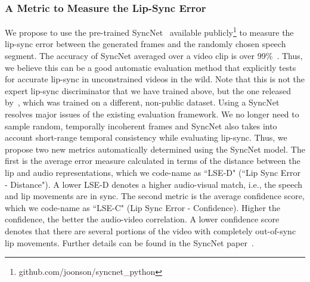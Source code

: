 \documentclass[sigconf]{acmart}
\begin{document}
\subsubsection{A Metric to Measure the Lip-Sync Error}
We propose to use the pre-trained SyncNet~\cite{Chung16a} available publicly\footnote{github.com/joonson/syncnet\_python} to measure the lip-sync error between the generated frames and the randomly chosen speech segment. The accuracy of SyncNet averaged over a video clip is over 99\%~\cite{Chung16a}. Thus, we believe this can be a good automatic evaluation method that explicitly tests for accurate lip-sync in unconstrained videos in the wild. Note that this is not the expert lip-sync discriminator that we have trained above, but the one released by~\citet{Chung16a}, which was trained on a different, non-public dataset. Using a SyncNet resolves major issues of the existing evaluation framework. We no longer need to sample random, temporally incoherent frames and SyncNet also takes into account short-range temporal consistency while evaluating lip-sync. Thus, we propose two new metrics automatically determined using the SyncNet model. The first is the average error measure calculated in terms of the distance between the lip and audio representations, which we code-name as ``LSE-D" (``Lip Sync Error - Distance"). A lower LSE-D denotes a higher audio-visual match, i.e., the speech and lip movements are in sync. The second metric is the average confidence score, which we code-name as ``LSE-C" (Lip Sync Error - Confidence). Higher the confidence, the better the audio-video correlation. A lower confidence score denotes that there are several portions of the video with completely out-of-sync lip movements. Further details can be found in the SyncNet paper~\cite{Chung16a}.
\end{document}
